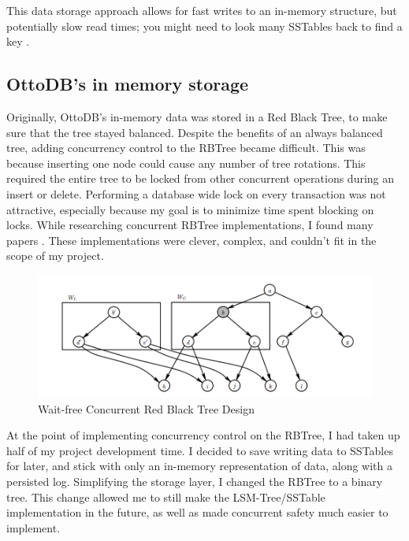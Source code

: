 \documentclass[conference]{IEEEtran}
\begin{document}
    This data storage approach allows for fast writes to an in-memory structure, but potentially slow read times; you might need to look many SSTables back to find a key \cite[p. 79]{b18}.

    \subsection{OttoDB's in memory storage}

    Originally, OttoDB's in-memory data was stored in a Red Black Tree, to make sure that the tree stayed balanced. Despite the benefits of an always balanced tree, adding concurrency control to the RBTree became difficult. This was because inserting one node could cause any number of tree rotations. This required the entire tree to be locked from other concurrent operations during an insert or delete. Performing a database wide lock on every transaction was not attractive, especially because my goal is to minimize time spent blocking on locks. While researching concurrent RBTree implementations, I found many papers \cite{b20, b21}. These implementations were clever, complex, and couldn't fit in the scope of my project.

    \begin{figure}[h]
        \centering
        \includegraphics[width=\columnwidth]{figures/ConcurrentRBTree.png}
        \caption{Wait-free Concurrent Red Black Tree Design \cite{b20}}
        \end{figure}

    At the point of implementing concurrency control on the RBTree, I had taken up half of my project development time. I decided to save writing data to SSTables for later, and stick with only an in-memory representation of data, along with a persisted log. Simplifying the storage layer, I changed the RBTree to a  binary tree. This change allowed me to still make the LSM-Tree/SSTable implementation in the future, as well as made concurrent safety much easier to implement.
\end{document}
